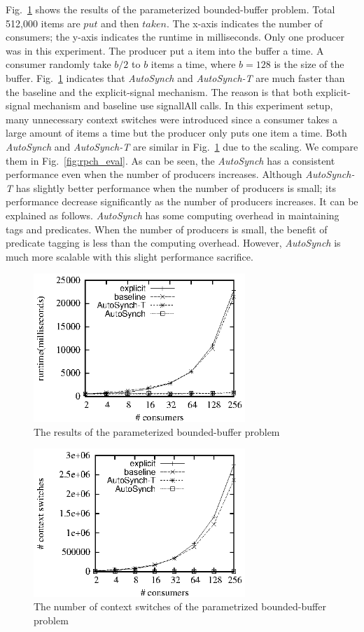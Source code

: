 \documentclass[preprint]{sigplanconf}
\begin{document}
Fig.~\ref{fig:rpc_eval} shows the results of the parameterized bounded-buffer 
problem. Total
512,000 items are $put$ and then $taken$. The x-axis indicates the number of 
consumers; the y-axis indicates the runtime in milliseconds. Only one producer
was in this experiment. The producer put a item into the buffer a time. A 
consumer randomly take $b/2$ to $b$ items a time, where $b = 128$ is the size of 
the buffer. Fig.~\ref{fig:rpc_eval} indicates that {\em AutoSynch} and {\em
AutoSynch-T} are
much faster than the baseline and the explicit-signal mechanism. The reason is
that both explicit-signal mechanism and baseline use signallAll calls. In this
experiment setup, many unnecessary context switches were introduced since a
consumer takes a large amount of items a time but the producer only puts one
item a time. Both {\em AutoSynch} and {\em AutoSynch-T} are similar in
Fig.~\ref{fig:rpc_eval} due to the scaling. We compare them in
Fig.~\ref{fig:rpch_eval}. As can be seen, the {\em AutoSynch} has a consistent
performance even when the number of producers increases. Although {\em
AutoSynch-T} has
slightly better performance when the number of producers is small; its 
performance decrease significantly as the number of producers increases. It can
be explained as follows. {\em AutoSynch} has some computing overhead in maintaining 
tags and predicates. When the number of producers is small, the benefit of
predicate tagging is less than the computing overhead. However, {\em AutoSynch} is
much more scalable with this slight performance sacrifice.

\begin{figure}[ht!]
  \centering
  \includegraphics[width=80mm]{fig/rpc.eps}
  \caption{The results of the parameterized bounded-buffer problem}
  \label{fig:rpc_eval}
\end{figure}

\begin{figure}[ht!]
  \centering
  \includegraphics[width=80mm]{fig/csrpc.eps}
  \caption{The number of context switches of the parametrized bounded-buffer 
  problem}
  \label{fig:csrpc_eval}
\end{figure}
\end{document}
